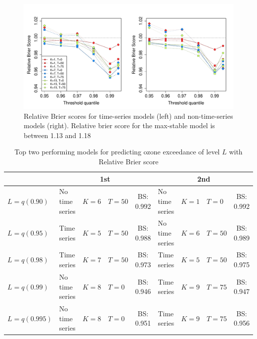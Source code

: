 \documentclass[useAMS,usenatbib,referee]{biom}
\begin{document}
\begin{figure}
  \includegraphics[width=\linewidth]{plots/bs-ozone.pdf}
  \caption{Relative Brier scores for time-series models (left) and non-time-series models (right). Relative brier score for the max-stable model is between 1.13 and 1.18}
  \label{stfig:bs-ozone}
\end{figure}
\begin{table}
  \small
  \caption{Top two performing models for predicting ozone exceedance of level $L$ with Relative Brier score}
  \label{sttbl:ozoneresults}
  \centering
  \begin{tabular}{|l|l l l c|l l l c|}
    \cline{2-9}
    \multicolumn{1}{c|}{}  & \multicolumn{4}{c|}{1st} & \multicolumn{4}{c|}{2nd} \\
    \hline
    $L = q(0.90)$  & No time series & $K=6$  & $T=50$  & BS: 0.992 &
                 No time series & $K=1$  & $T=0$  & BS: 0.992 \\
    $L = q(0.95)$  & Time series & $K=5$ & $T=50$ & BS: 0.988 &
                 No time series & $K=6$  & $T=50$ & BS: 0.989\\
    $L = q(0.98)$  & Time series & $K=7$  & $T=50$ & BS: 0.973 &
                 Time series & $K=5$ & $T=50$ & BS: 0.975\\
    $L = q(0.99)$  & No time series    & $K=8$ & $T=0$ & BS: 0.946 &
                 Time series    & $K=9$  & $T=75$ & BS: 0.947\\
    $L = q(0.995)$ & No time series    & $K=8$  & $T=0$ & BS: 0.951 &
                 Time series    & $K=9$ & $T=75$ & BS: 0.956\\
    \hline
  \end{tabular}
\end{table}
\end{document}
